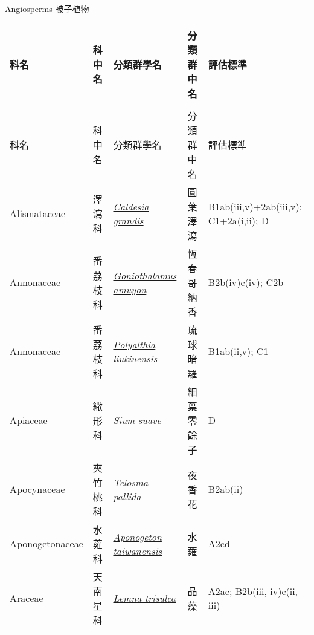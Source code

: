 \noindent\normalfont\selectfont Angiosperms 被子植物
\footnotesize\selectfont
        {\def\arraystretch{1.5}\tabcolsep=2pt
        \begin{longtable}{p{2.5cm}p{2.5cm}p{4.5cm}p{2.5cm}p{3cm}}
        \toprule
          科名 & 科中名 & 分類群學名 & 分類群中名 & 評估標準 \\
        \midrule 
        \endfirsthead

        \multicolumn{4}{l}{\bfseries\Large\color{red}{國家極危 (NCR) 類別維管束植物名錄(續)}} \\
        \toprule
        科名 & 科中名 & 分類群學名 & 分類群中名 & 評估標準 \\
        \midrule
        \endhead
                Alismataceae & 澤瀉科 & \href{http://www.theplantlist.org/tpl1.1/search?q=Caldesia+grandis}{\textit{Caldesia grandis} } & 圓葉澤瀉 & B1ab(iii,v)+2ab(iii,v); C1+2a(i,ii); D \index{Caldesia@\textit{Caldesia}!grandis@\textit{grandis}}  \index{圓葉澤瀉} \\
    Annonaceae & 番荔枝科 & \href{http://www.theplantlist.org/tpl1.1/search?q=Goniothalamus+amuyon}{\textit{Goniothalamus amuyon} } & 恆春哥納香 & B2b(iv)c(iv); C2b \index{Goniothalamus@\textit{Goniothalamus}!amuyon@\textit{amuyon}}  \index{恆春哥納香} \\
    Annonaceae & 番荔枝科 & \href{http://www.theplantlist.org/tpl1.1/search?q=Polyalthia+liukiuensis}{\textit{Polyalthia liukiuensis} } & 琉球暗羅 & B1ab(ii,v); C1 \index{Polyalthia@\textit{Polyalthia}!liukiuensis@\textit{liukiuensis}}  \index{琉球暗羅} \\
    Apiaceae & 繖形科 & \href{http://www.theplantlist.org/tpl1.1/search?q=Sium+suave}{\textit{Sium suave} } & 細葉零餘子 & D \index{Sium@\textit{Sium}!suave@\textit{suave}}  \index{細葉零餘子} \\
    Apocynaceae & 夾竹桃科 & \href{http://www.theplantlist.org/tpl1.1/search?q=Telosma+pallida}{\textit{Telosma pallida} } & 夜香花 & B2ab(ii) \index{Telosma@\textit{Telosma}!pallida@\textit{pallida}}  \index{夜香花} \\
    Aponogetonaceae & 水蕹科 & \href{http://www.theplantlist.org/tpl1.1/search?q=Aponogeton+taiwanensis}{\textit{Aponogeton taiwanensis} } & 水蕹 & A2cd \index{Aponogeton@\textit{Aponogeton}!taiwanensis@\textit{taiwanensis}}  \index{水蕹} \\
    Araceae & 天南星科 & \href{http://www.theplantlist.org/tpl1.1/search?q=Lemna+trisulca}{\textit{Lemna trisulca} } & 品藻 & A2ac; B2b(iii, iv)c(ii, iii) \index{Lemna@\textit{Lemna}!trisulca@\textit{trisulca}}  \index{品藻} \\

\end{longtable}}
